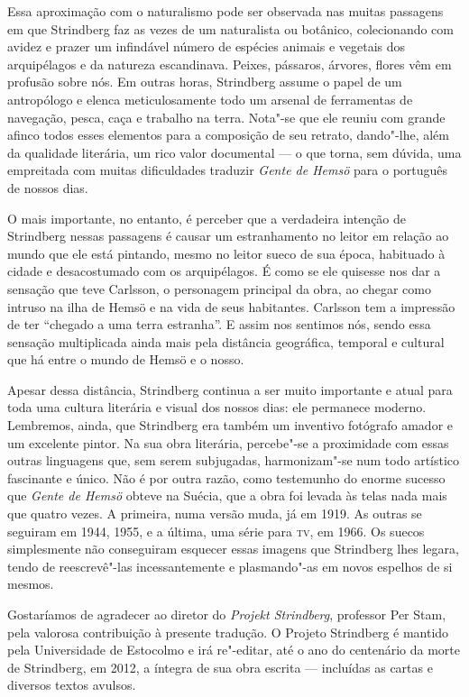 Essa aproximação com o naturalismo pode ser observada nas muitas passagens em que
Strindberg faz as vezes de um naturalista ou botânico, colecionando com
avidez e prazer um infindável número de espécies animais e vegetais dos
arquipélagos e da natureza escandinava. Peixes, pássaros, árvores,
flores vêm em profusão sobre nós. Em outras horas, Strindberg assume o
papel de um antropólogo e elenca meticulosamente todo um arsenal de
ferramentas de navegação, pesca, caça e trabalho na terra. Nota"-se que
ele reuniu com grande afinco todos esses elementos para a composição de
seu retrato, dando"-lhe, além da qualidade literária, um rico valor documental --- o que torna, sem dúvida, uma empreitada com muitas dificuldades traduzir 
\textit{Gente de Hemsö} para o português de nossos dias.

O mais importante, no entanto, é perceber que a verdadeira intenção de
Strindberg nessas passagens é causar um estranhamento no leitor em
relação ao mundo que ele está pintando, mesmo no leitor sueco de sua
época, habituado à cidade e desacostumado com os arquipélagos. É como
se ele quisesse nos dar a sensação que teve Carlsson, o personagem
principal da obra, ao chegar como intruso na ilha de Hemsö e na vida de
seus habitantes. Carlsson tem a impressão de ter “chegado a uma
terra estranha”. E assim nos sentimos nós, sendo essa sensação
multiplicada ainda mais pela distância geográfica, temporal e cultural
que há entre o mundo de Hemsö e o nosso.

Apesar dessa distância, Strindberg continua a ser muito importante e atual
para toda uma cultura literária e visual dos nossos dias: ele permanece
moderno. Lembremos, ainda, que Strindberg era também um inventivo fotógrafo amador
e um excelente pintor. Na sua obra literária, percebe"-se a proximidade com 
essas outras linguagens que, sem serem subjugadas, harmonizam"-se num todo
artístico fascinante e único. Não é por outra razão, como testemunho do enorme sucesso
que \textit{Gente de Hemsö} obteve na Suécia, que a obra foi levada às telas nada mais
que quatro vezes.  A primeira, numa versão muda, já em 1919. As outras se
seguiram em 1944, 1955, e a última, uma série para \textsc{tv}, em 1966. 
Os suecos simplesmente não conseguiram esquecer essas imagens que
Strindberg lhes legara, tendo de reescrevê"-las incessantemente e 
plasmando"-as em novos espelhos de si mesmos. 



\asterisc

Gostaríamos de agradecer ao diretor do \textit{Projekt Strindberg}, professor
Per Stam, pela valorosa contribuição à presente tradução. O Projeto
Strindberg é mantido pela Universidade de Estocolmo e irá re"-editar,
até o ano do centenário da morte de Strindberg, em 2012, a íntegra de
sua obra escrita --- incluídas as cartas e diversos textos avulsos. 




